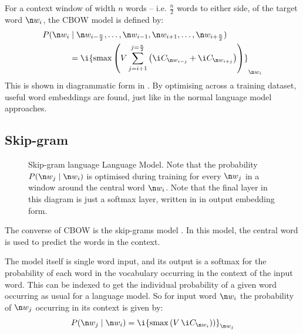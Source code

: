 {For a context window of width $n$ words -- i.e. $\frac{n}{2}$ words to either side, of the target word $\n w_i$,
the CBOW model is defined by:
\begin{align}
P(\n w_i & \mid \n w_{i-\frac{n}{2}},\ldots, \n w_{i-1}, \n w_{i+1},\ldots, \n w_{i+\frac{n}{2}})  \nonumber
\\  & = \i {\softmax \left(V \sum_{j=i+1}^{j=\frac{n}{2}} \left( \i C_{\n w_{i-j}}+\i C_{\n w_{i+j}} \right)\right)}_{\n w_i}
\end{align}
This is shown in diagrammatic form in .
By optimising across a training dataset, useful word embeddings are found,
just like in the normal language model approaches.


\subsection{Skip-gram}\label{sec:skip-gram}
\begin{figure}
	\caption{Skip-gram language Language Model. Note that the probability $P(\n w_j \mid \n w_i)$ is optimised during training for every $\n w_j$ in a window around the central word $\n w_i$.
	Note that the final layer in this diagram is just a softmax layer, written in in output embedding form.}
	\label{fig:skip-gram} 
	\centering
		
\end{figure}



The converse of CBOW is the skip-grams model .
In this model, the central word is used to predict the words in the context.

The model itself is single word input, and its output is a softmax for the probability of each word in the vocabulary occurring in the context of the input word.
This can be indexed to get the individual probability of a given word occurring as usual for a language model.
So for input word $\n w_i$ the probability of $\n w_j$ occurring in its context is given by:
\begin{equation}
P(\n w_j \mid \n w_i) = \i {\softmax \left( V\,\i C_{\n w_i}) \right)}_{\n w_j} \label{equ:skipgram}
\end{equation}


}
